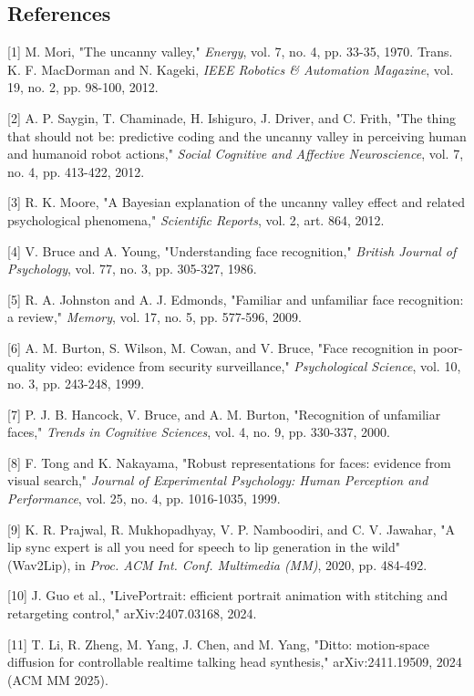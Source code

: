 \documentclass[
]{article}
\begin{document}
\subsection{References}\label{references}

{[}1{]} M. Mori, "The uncanny valley," \emph{Energy}, vol. 7, no. 4, pp.
33-35, 1970. Trans. K. F. MacDorman and N. Kageki, \emph{IEEE Robotics
\& Automation Magazine}, vol. 19, no. 2, pp. 98-100, 2012.

{[}2{]} A. P. Saygin, T. Chaminade, H. Ishiguro, J. Driver, and C.
Frith, "The thing that should not be: predictive coding and the uncanny
valley in perceiving human and humanoid robot actions," \emph{Social
Cognitive and Affective Neuroscience}, vol. 7, no. 4, pp. 413-422, 2012.

{[}3{]} R. K. Moore, "A Bayesian explanation of the
\textquotesingle uncanny valley\textquotesingle{} effect and related
psychological phenomena," \emph{Scientific Reports}, vol. 2, art. 864,
2012.

{[}4{]} V. Bruce and A. Young, "Understanding face recognition,"
\emph{British Journal of Psychology}, vol. 77, no. 3, pp. 305-327, 1986.

{[}5{]} R. A. Johnston and A. J. Edmonds, "Familiar and unfamiliar face
recognition: a review," \emph{Memory}, vol. 17, no. 5, pp. 577-596,
2009.

{[}6{]} A. M. Burton, S. Wilson, M. Cowan, and V. Bruce, "Face
recognition in poor-quality video: evidence from security surveillance,"
\emph{Psychological Science}, vol. 10, no. 3, pp. 243-248, 1999.

{[}7{]} P. J. B. Hancock, V. Bruce, and A. M. Burton, "Recognition of
unfamiliar faces," \emph{Trends in Cognitive Sciences}, vol. 4, no. 9,
pp. 330-337, 2000.

{[}8{]} F. Tong and K. Nakayama, "Robust representations for faces:
evidence from visual search," \emph{Journal of Experimental Psychology:
Human Perception and Performance}, vol. 25, no. 4, pp. 1016-1035, 1999.

{[}9{]} K. R. Prajwal, R. Mukhopadhyay, V. P. Namboodiri, and C. V.
Jawahar, "A lip sync expert is all you need for speech to lip generation
in the wild" (Wav2Lip), in \emph{Proc. ACM Int. Conf. Multimedia (MM)},
2020, pp. 484-492.

{[}10{]} J. Guo et al., "LivePortrait: efficient portrait animation with
stitching and retargeting control," arXiv:2407.03168, 2024.

{[}11{]} T. Li, R. Zheng, M. Yang, J. Chen, and M. Yang, "Ditto:
motion-space diffusion for controllable realtime talking head
synthesis," arXiv:2411.19509, 2024 (ACM MM 2025).
\end{document}

